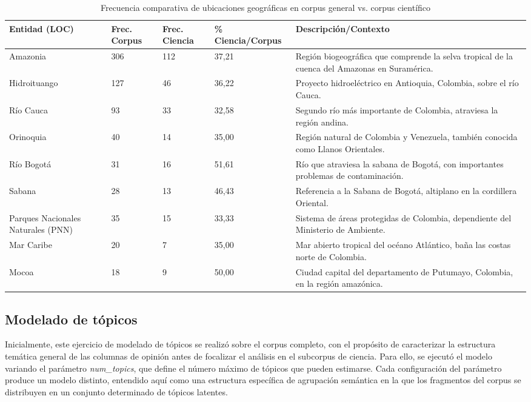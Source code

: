 \documentclass[11pt,a4paper]{article}
\begin{document}
	\begin{table}[H]
		\centering
		\caption{Frecuencia comparativa de ubicaciones geográficas en corpus general vs. corpus científico}
		\label{tab:ents_loc}
		\footnotesize 
		\begin{tabular}{p{3cm}P{2.2cm}P{2.2cm}P{2.2cm}p{5cm}}
			\toprule
			\textbf{Entidad (LOC)} & 
			\textbf{Frec. Corpus} & 
			\textbf{Frec. Ciencia} & 
			\textbf{\% Ciencia/Corpus} & 
			\textbf{Descripción/Contexto} \\
			\midrule
			Amazonia & 306 & 112 & 37,21 & Región biogeográfica que comprende la selva tropical de la cuenca del Amazonas en Suramérica. \\
			Hidroituango & 127 & 46 & 36,22 & Proyecto hidroeléctrico en Antioquia, Colombia, sobre el río Cauca. \\
			Río Cauca & 93 & 33 & 32,58 & Segundo río más importante de Colombia, atraviesa la región andina. \\
			Orinoquia & 40 & 14 & 35,00 & Región natural de Colombia y Venezuela, también conocida como Llanos Orientales. \\
			Río Bogotá & 31 & 16 & 51,61 & Río que atraviesa la sabana de Bogotá, con importantes problemas de contaminación. \\
			Sabana & 28 & 13 & 46,43 & Referencia a la Sabana de Bogotá, altiplano en la cordillera Oriental. \\
			Parques Nacionales Naturales (PNN) & 35 & 15 & 33,33 & Sistema de áreas protegidas de Colombia, dependiente del Ministerio de Ambiente. \\
			Mar Caribe & 20 & 7 & 35,00 & Mar abierto tropical del océano Atlántico, baña las costas norte de Colombia. \\
			Mocoa & 18 & 9 & 50,00 & Ciudad capital del departamento de Putumayo, Colombia, en la región amazónica. \\
			\bottomrule
		\end{tabular}
	\end{table}
	
	
	\subsection{Modelado de tópicos}
Inicialmente, este ejercicio de modelado de tópicos se realizó sobre el corpus completo, con el propósito de caracterizar la estructura temática general de las columnas de opinión antes de focalizar el análisis en el subcorpus de ciencia. Para ello, se ejecutó el modelo variando el parámetro \textit{num\_topics}, que define el número máximo de tópicos que pueden estimarse. Cada configuración del parámetro produce un modelo distinto, entendido aquí como una estructura específica de agrupación semántica en la que los fragmentos del corpus se distribuyen en un conjunto determinado de tópicos latentes.
\end{document}
